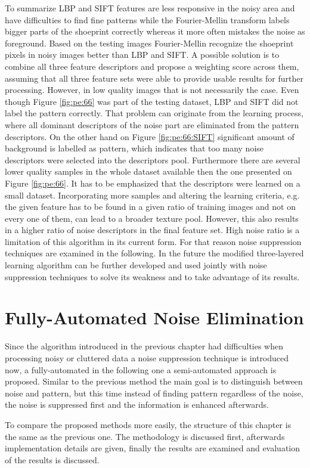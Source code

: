 \documentclass[draft,final]{vutinfth} %
\begin{document}
\par
To summarize LBP and SIFT features are less responsive in the noisy area and have difficulties to find fine patterns while the Fourier-Mellin transform labels bigger parts of the shoeprint correctly whereas it more often mistakes the noise as foreground.
Based on the testing images Fourier-Mellin recognize the shoeprint pixels in noisy images better than LBP and SIFT.
A possible solution is to combine all three feature descriptors and propose a weighting score across them, assuming that all three feature sets were able to provide usable results for further processing.
However, in low quality images that is not necessarily the case.
Even though Figure \ref{fig:pe:66} was part of the testing dataset, LBP and SIFT did not label the pattern correctly.
That problem can originate from the learning process, where all dominant descriptors of the noise part are eliminated from the pattern descriptors.
On the other hand on Figure \ref{fig:pe:66:SIFT} significant amount of background is labelled as pattern, which indicates that too many noise descriptors were selected into the descriptors pool.
Furthermore there are several lower quality samples in the whole dataset available then the one presented on Figure  \ref{fig:pe:66}.
It has to be emphasized that the descriptors were learned on a small dataset.
Incorporating more samples and altering the learning criteria, e.g. the given feature has to be found in a given ratio of training images and not on every one of them, can lead to a broader texture pool.
However, this also results in a higher ratio of noise descriptors in the final feature set.
High noise ratio is a limitation of this algorithm in its current form.
For that reason noise suppression techniques are examined in the following.
In the future the modified three-layered learning algorithm can be further developed and used jointly with noise suppression techniques to solve its weakness and to take advantage of its results.

\chapter{Fully-Automated Noise Elimination}

Since the algorithm introduced in the previous chapter had difficulties when processing noisy or cluttered data a noise suppression technique is introduced now, a fully-automated in the following one a semi-automated approach is proposed.
Similar to the previous method the main goal is to distinguish between noise and pattern, but this time instead of finding pattern regardless of the noise, the noise is suppressed first and the information is enhanced afterwards.
\par
To compare the proposed methods more easily, the structure of this chapter is the same as the previous one.
The methodology is discussed first, afterwards implementation details are given, finally the results are examined and evaluation of the results is discussed.
\end{document}
